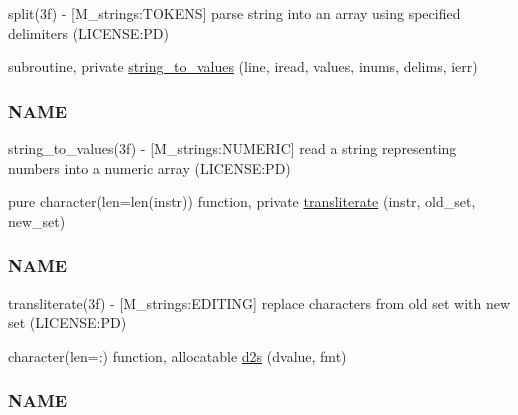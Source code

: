 \begin{DoxyCompactItemize}
\begin{DoxyCompactList}
split(3f) -\/ \mbox{[}M\+\_\+strings\+:T\+O\+K\+E\+NS\mbox{]} parse string into an array using specified delimiters (L\+I\+C\+E\+N\+SE\+:PD) \end{DoxyCompactList}\item 
subroutine, private \mbox{\hyperlink{namespacem__time_aa6ebf9f13e386a27257b5d207fcd3eec}{string\+\_\+to\+\_\+values}} (line, iread, values, inums, delims, ierr)
\begin{DoxyCompactList}\small\item\em \subsubsection*{N\+A\+ME}

string\+\_\+to\+\_\+values(3f) -\/ \mbox{[}M\+\_\+strings\+:N\+U\+M\+E\+R\+IC\mbox{]} read a string representing numbers into a numeric array (L\+I\+C\+E\+N\+SE\+:PD) \end{DoxyCompactList}\item 
pure character(len=len(instr)) function, private \mbox{\hyperlink{namespacem__time_a6e202d6d900515a44ab8a7cbb886a68e}{transliterate}} (instr, old\+\_\+set, new\+\_\+set)
\begin{DoxyCompactList}\small\item\em \subsubsection*{N\+A\+ME}

transliterate(3f) -\/ \mbox{[}M\+\_\+strings\+:E\+D\+I\+T\+I\+NG\mbox{]} replace characters from old set with new set (L\+I\+C\+E\+N\+SE\+:PD) \end{DoxyCompactList}\item 
character(len=\+:) function, allocatable \mbox{\hyperlink{namespacem__time_a0b88094db657df167f8e57aa4362259e}{d2s}} (dvalue, fmt)
\begin{DoxyCompactList}\small\item\em \subsubsection*{N\+A\+ME}


\end{DoxyCompactList}
\end{DoxyCompactItemize}
